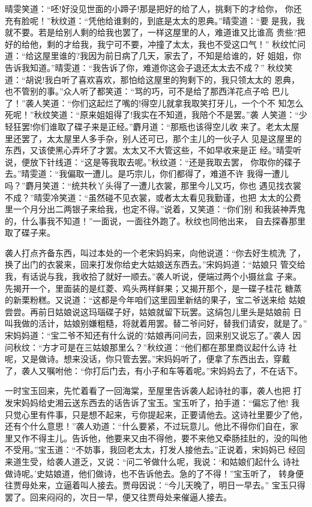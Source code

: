 晴雯笑道：“呸!好没见世面的小蹄子!那是把好的给了人，挑剩下的才给你，
你还充有脸呢！”秋纹道：“凭他给谁剩的，到底是太太的恩典。”晴雯道：“要
是我，我就不要。若是给别人剩的给我也罢了，一样这屋里的人，难道谁又比谁高
贵些?把好的给他，剩的才给我，我宁可不要，冲撞了太太，我也不受这口气！”
秋纹忙问道：“给这屋里谁的?我因为前日病了几天，家去了，不知是给谁的，好
姐姐，你告诉我知道。”晴雯道：“我告诉了你，难道你这会子退还太太去不成？”
秋纹笑道：“胡说!我白听了喜欢喜欢，那怕给这屋里的狗剩下的，我只领太太的
恩典，也不管别的事。”众人听了都笑道：“骂的巧，可不是给了那西洋花点子哈
巴儿了！”袭人笑道：“你们这起烂了嘴的!得空儿就拿我取笑打牙儿，一个个不
知怎么死呢！”秋纹笑道：“原来姐姐得了!我实在不知道，我陪个不是罢。”袭
人笑道：“少轻狂罢!你们谁取了碟子来是正经。”麝月道：“那瓶也该得空儿收
来了。老太太屋里还罢了，太太屋里人多手杂，别人还可已，那个主儿的一伙子人
见是这屋里的东西，又该使黑心弄坏了才罢。太太又不大管这些，不如早收来是正
经。”晴雯听说，便放下针线道：“这是等我取去呢。”秋纹道：“还是我取去罢，
你取你的碟子去。”晴雯道：“我偏取一遭儿。是巧宗儿，你们都得了，难道不许
我得一遭儿吗？”麝月笑道：“统共秋丫头得了一遭儿衣裳，那里今儿又巧，你也
遇见找衣裳不成？”晴雯冷笑道：“虽然碰不见衣裳，或者太太看见我勤谨，也把
太太的公费里一个月分出二两银子来给我，也定不得。”说着，又笑道：“你们别
和我装神弄鬼的，什么事我不知道！”一面说，一面往外跑了。秋纹也同他出来，
自去探春那里取了碟子来。

袭人打点齐备东西，叫过本处的一个老宋妈妈来，向他说道：“你去好生梳洗
了，换了出门的衣裳来，回来打发你给史大姑娘送东西去。”宋妈妈道：“姑娘只
管交给我，有话说与我，我收拾了就好一顺去。”袭人听说，便端过两个小摄丝盒
子来。先揭开一个，里面装的是红菱、鸡头两样鲜果；又揭开那个，是一碟子桂花
糖蒸的新栗粉糕。又说道：“这都是今年咱们这里园里新结的果子，宝二爷送来给
姑娘尝尝。再前日姑娘说这玛瑙碟子好，姑娘就留下玩罢。这绢包儿里头是姑娘前
日叫我做的活计，姑娘别嫌粗糙，将就着用罢。替二爷问好，替我们请安，就是了。”
宋妈妈道：“宝二爷不知还有什么说的?姑娘再问问去，回来别又说忘了。”袭人
因问秋纹：“方才可是在三姑娘那里么？”秋纹道：“他们都在那里商议起什么诗
社呢，又是做诗。想来没话，你只管去罢。”宋妈妈听了，便拿了东西出去，穿戴
了，袭人又嘱咐他：“你打后门去，有小子和车等着呢。”宋妈妈去了，不在话下。

一时宝玉回来，先忙着看了一回海棠，至屋里告诉袭人起诗社的事，袭人也把
打发宋妈妈给史湘云送东西去的话告诉了宝玉。宝玉听了，拍手道：“偏忘了他!
我只觉心里有件事，只是想不起来，亏你提起来，正要请他去。这诗社里要少了他，
还有个什么意思！”袭人劝道：“什么要紧，不过玩意儿。他比不得你们自在，家
里又作不得主儿。告诉他，他要来又由不得他，要不来他又牵肠挂肚的，没的叫他
不受用。”宝玉道：“不妨事，我回老太太，打发人接他去。”正说着，宋妈妈已
经回来道生受，给袭人道乏，又说：“问二爷做什么呢，我说：‘和姑娘们起什么
诗社做诗呢。’史姑娘道，他们做诗，也不告诉他去。急的了不得！”宝玉听了，
转身便往贾母处来，立逼着叫人接去。贾母因说：“今儿天晚了，明日一早去。”
宝玉只得罢了。回来闷闷的，次日一早，便又往贾母处来催逼人接去。

